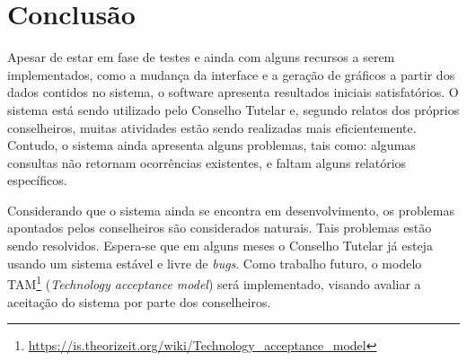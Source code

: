\documentclass[12pt]{article}
\begin{document}
\section{Conclusão}

Apesar de estar em fase de testes e ainda com alguns recursos a serem implementados, como a mudança da interface e a geração de gráficos a partir dos dados contidos no sistema, o software apresenta resultados iniciais satisfatórios. O sistema está sendo utilizado pelo Conselho Tutelar e, segundo relatos dos próprios conselheiros, muitas atividades estão sendo realizadas mais eficientemente. Contudo, o sistema ainda apresenta alguns problemas, tais como: algumas consultas não retornam ocorrências existentes, e faltam alguns relatórios específicos. 

Considerando que o sistema ainda se encontra em desenvolvimento, os problemas apontados pelos conselheiros são considerados naturais. Tais problemas estão sendo resolvidos. Espera-se que em alguns meses o Conselho Tutelar já esteja usando um sistema estável e livre de \textit{bugs}. Como trabalho futuro, o modelo TAM\footnote{\url{https://is.theorizeit.org/wiki/Technology_acceptance_model}} (\textit{Technology acceptance model}) será implementado, visando avaliar a aceitação do sistema por parte dos conselheiros. 



\end{document}
